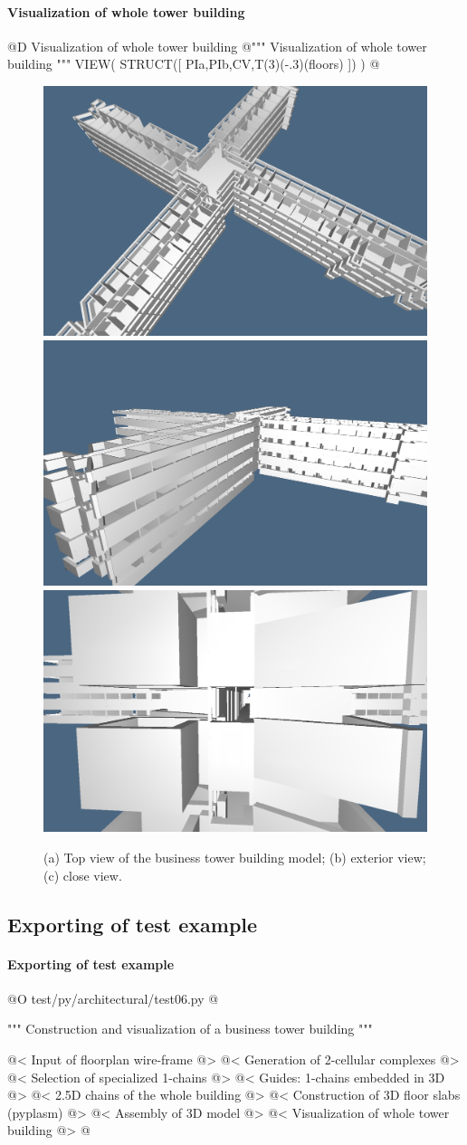 \documentclass[11pt,oneside]{article}    %
\begin{document}
\paragraph{Visualization of whole tower building}
@D Visualization of whole tower building
@{""" Visualization of whole tower building """
VIEW( STRUCT([ PIa,PIb,CV,T(3)(-.3)(floors) ]) )
@}


\begin{figure}[htbp] %
   \centering
   \includegraphics[width=0.325\linewidth]{images/tower1} 
   \includegraphics[width=0.325\linewidth]{images/tower2} 
   \includegraphics[width=0.325\linewidth]{images/tower3} 
   \caption{(a) Top view of the business tower building model; (b) exterior view; (c) close view.}
   \label{fig:towerplan1}
\end{figure}


\subsection{Exporting of test example}

\paragraph{Exporting of test example}
@O test/py/architectural/test06.py
@{""" Construction and visualization of a business tower building """

@< Input of floorplan wire-frame @>
@< Generation of 2-cellular complexes @>
@< Selection of specialized 1-chains @>
@< Guides: 1-chains embedded in 3D @>
@< 2.5D chains of the whole building @>
@< Construction of 3D floor slabs (pyplasm) @>
@< Assembly of 3D model @>
@< Visualization of whole tower building @>
@}
\end{document}
